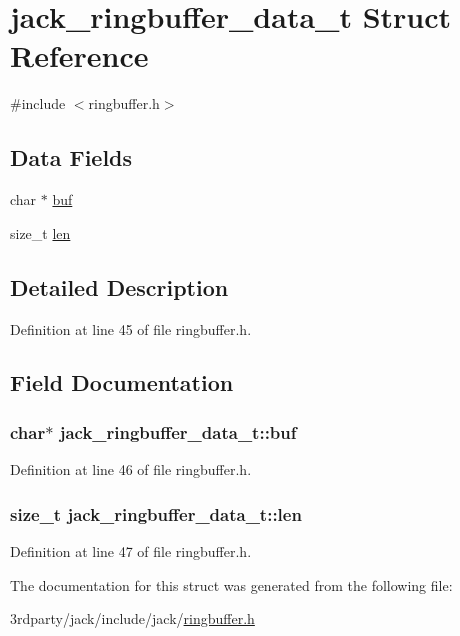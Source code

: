\hypertarget{structjack__ringbuffer__data__t}{\section{jack\-\_\-ringbuffer\-\_\-data\-\_\-t \-Struct \-Reference}
\label{d7/dd9/structjack__ringbuffer__data__t}
}


{\ttfamily \#include $<$ringbuffer.\-h$>$}

\subsection*{\-Data \-Fields}
\begin{DoxyCompactItemize}
\item 
char $\ast$ \hyperlink{structjack__ringbuffer__data__t_aed40aa302461ab6121befd1b21813b1d}{buf}
\item 
size\-\_\-t \hyperlink{structjack__ringbuffer__data__t_ab4e5b8f57904fd9f49261697584b2640}{len}
\end{DoxyCompactItemize}


\subsection{\-Detailed \-Description}


\-Definition at line 45 of file ringbuffer.\-h.



\subsection{\-Field \-Documentation}
\hypertarget{structjack__ringbuffer__data__t_aed40aa302461ab6121befd1b21813b1d}{
\subsubsection[{buf}]{\setlength{\rightskip}{0pt plus 5cm}char$\ast$ {\bf jack\-\_\-ringbuffer\-\_\-data\-\_\-t\-::buf}}}\label{d7/dd9/structjack__ringbuffer__data__t_aed40aa302461ab6121befd1b21813b1d}


\-Definition at line 46 of file ringbuffer.\-h.

\hypertarget{structjack__ringbuffer__data__t_ab4e5b8f57904fd9f49261697584b2640}{
\subsubsection[{len}]{\setlength{\rightskip}{0pt plus 5cm}size\-\_\-t {\bf jack\-\_\-ringbuffer\-\_\-data\-\_\-t\-::len}}}\label{d7/dd9/structjack__ringbuffer__data__t_ab4e5b8f57904fd9f49261697584b2640}


\-Definition at line 47 of file ringbuffer.\-h.



\-The documentation for this struct was generated from the following file\-:\begin{DoxyCompactItemize}
\item 
3rdparty/jack/include/jack/\hyperlink{ringbuffer_8h}{ringbuffer.\-h}\end{DoxyCompactItemize}
